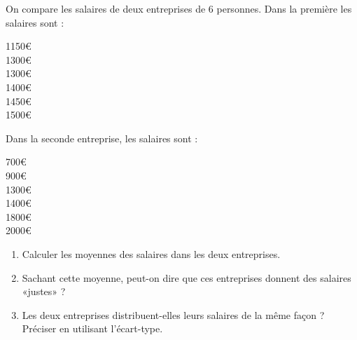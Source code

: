 
\begin{exercice}\label{exosmath-0244}

    On compare les salaires de deux entreprises de \( 6\) personnes. Dans la première les salaires sont :
    \begin{center}
    \begin{multicols}{3}
        1150€\\
        1300€\\ 
        1300€\\
        1400€\\
        1450€\\
        1500€
    \end{multicols}
    \end{center}
    Dans la seconde entreprise, les salaires sont :
    \begin{center}
    \begin{multicols}{3}
        700€\\
        900€\\
        1300€\\
        1400€\\
        1800€\\
        2000€
    \end{multicols}
    \end{center}
    \begin{enumerate}
        \item
            Calculer les moyennes des salaires dans les deux entreprises.
        \item
            Sachant cette moyenne, peut-on dire que ces entreprises donnent des salaires «justes» ?
        \item
            Les deux entreprises distribuent-elles leurs salaires de la même façon ? Préciser en utilisant l'écart-type.
    \end{enumerate}

\end{exercice}
